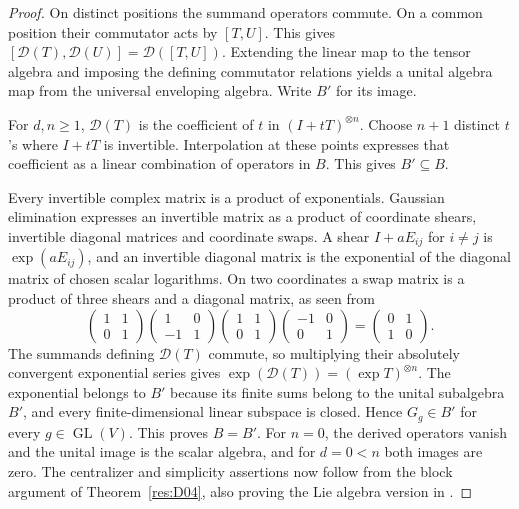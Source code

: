 \begin{proof}
On distinct positions the summand operators commute.
On a common position their commutator acts by \([T,U]\).
This gives \([\mathcal D(T),\mathcal D(U)]=\mathcal D([T,U])\).
Extending the linear map to the tensor algebra and imposing
the defining commutator relations yields a unital algebra map
from the universal enveloping algebra. Write \(B'\) for its image.

For \(d,n\geq1\), \(\mathcal D(T)\) is the coefficient of \(t\)
in \((I+tT)^{\otimes n}\). Choose \(n+1\) distinct \(t\)'s
where \(I+tT\) is invertible. Interpolation at these points
expresses that coefficient as a linear combination of operators
in \(B\). This gives \(B'\subseteq B\).

Every invertible complex matrix is a product of exponentials.
Gaussian elimination expresses an invertible matrix as a
product of coordinate shears, invertible diagonal matrices
and coordinate swaps. A shear \(I+aE_{ij}\) for \(i\ne j\)
is \(\exp(aE_{ij})\), and an invertible diagonal matrix is
the exponential of the diagonal matrix of chosen scalar
logarithms. On two coordinates a swap matrix is a product of
three shears and a diagonal matrix, as seen from
\[
 \begin{pmatrix}1&1\\0&1\end{pmatrix}
 \begin{pmatrix}1&0\\-1&1\end{pmatrix}
 \begin{pmatrix}1&1\\0&1\end{pmatrix}
 \begin{pmatrix}-1&0\\0&1\end{pmatrix}
     =\begin{pmatrix}0&1\\1&0\end{pmatrix}.
\]
The summands defining \(\mathcal D(T)\) commute, so multiplying
their absolutely convergent exponential series gives
\(\exp(\mathcal D(T))=(\exp T)^{\otimes n}\). The exponential
belongs to \(B'\) because its finite sums belong to the unital
subalgebra \(B'\), and every finite-dimensional linear subspace
is closed. Hence \(G_g\in B'\) for every \(g\in\operatorname{GL}(V)\).
This proves \(B=B'\). For \(n=0\), the derived operators vanish
and the unital image is the scalar algebra, and for \(d=0<n\)
both images are zero. The centralizer and simplicity assertions
now follow from the block argument of Theorem~\ref{res:D04},
also proving the Lie algebra version in
\cite[Theorems 4.55 and 4.57]{etingof}.
\end{proof}


